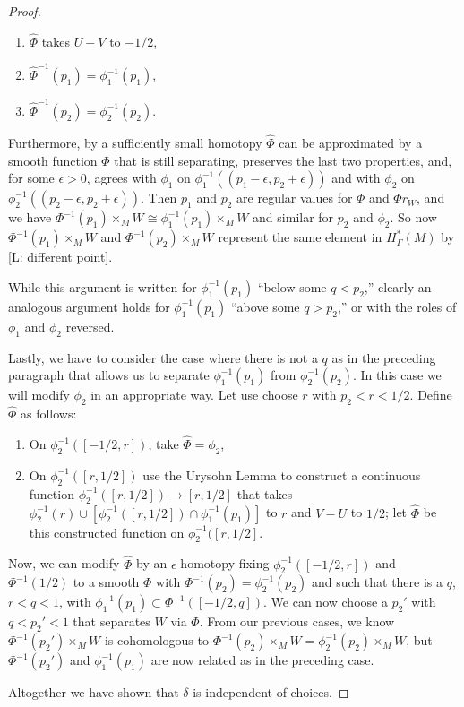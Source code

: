 \begin{proof}
\begin{enumerate}
		\item $\hat\Phi$ takes $U - V$ to $-1/2$,

		\item $\hat\Phi^{-1}(p_1) = \phi_1^{-1}(p_1)$,

		\item $\hat\Phi^{-1}(p_2) = \phi_2^{-1}(p_2)$.
	\end{enumerate}
	Furthermore, by a sufficiently small homotopy $\hat\Phi$ can be approximated by a smooth function $\Phi$ that is still separating, preserves the last two properties, and, for some $\epsilon >0$, agrees with $\phi_1$ on $\phi_1^{-1}((p_1-\epsilon,p_2+\epsilon))$ and with $\phi_2$ on $\phi_2^{-1}((p_2-\epsilon,p_2+\epsilon))$.
	Then $p_1$ and $p_2$ are regular values for $\Phi$ and $\Phi r_W$, and
	we have $\Phi^{-1}(p_1) \times_{M} W \cong \phi_1^{-1}(p_1) \times_{M} W$ and similar for $p_2$ and $\phi_2$.
	So now $\Phi^{-1}(p_1) \times_{M} W$ and $\Phi^{-1}(p_2) \times_{M} W$ represent the same element in $H^*_\Gamma(M)$ by \cref{L: different point}.

	While this argument is written for $\phi_1^{-1}(p_1)$ ``below some $q<p_2$,'' clearly an analogous argument holds for $\phi_1^{-1}(p_1)$ ``above some $q>p_2$,'' or with the roles of $\phi_1$ and $\phi_2$ reversed.

	Lastly, we have to consider the case where there is not a $q$ as in the preceding paragraph that allows us to separate $\phi_1^{-1}(p_1)$ from $\phi_2^{-1}(p_2)$.
	In this case we will modify $\phi_2$ in an appropriate way.
	Let use choose $r$ with $p_2 <r<1/2$.
	Define $\hat \Phi$ as follows:

	\begin{enumerate}
		\item On $\phi_2^{-1}([-1/2,r])$, take $\hat \Phi = \phi_2$,

		\item On $\phi_2^{-1}([r,1/2])$ use the Urysohn Lemma to construct a continuous function $\phi_2^{-1}([r,1/2]) \to [r,1/2]$ that takes $\phi_2^{-1}(r) \cup [\phi_2^{-1}([r,1/2]) \cap \phi_1^{-1}(p_1)]$ to $r$ and $V - U$ to $1/2$; let $\hat \Phi$ be this constructed function on $\phi_2^{-1}([r,1/2]$.
	\end{enumerate}

	Now, we can modify $\hat \Phi$ by an $\epsilon$-homotopy fixing $\phi_2^{-1}([-1/2,r])$ and $\Phi^{-1}(1/2)$ to a smooth $\Phi$ with $\Phi^{-1}(p_2) = \phi_2^{-1}(p_2)$ and such that there is a $q$, $r<q<1$, with $\phi_1^{-1}(p_1) \subset \Phi^{-1}([-1/2,q])$.
	We can now choose a $p_2'$ with $q<p_2'<1$ that separates $W$ via $\Phi$.
	From our previous cases, we know $\Phi^{-1}(p_2')\times_{M}W$ is cohomologous to $\Phi^{-1}(p_2)\times_{M}W = \phi_2^{-1}(p_2)\times_{M}W$, but $\Phi^{-1}(p_2')$ and $\phi_1^{-1}(p_1)$ are now related as in the preceding case.

	Altogether we have shown that $\delta$ is independent of choices.
\end{proof}

